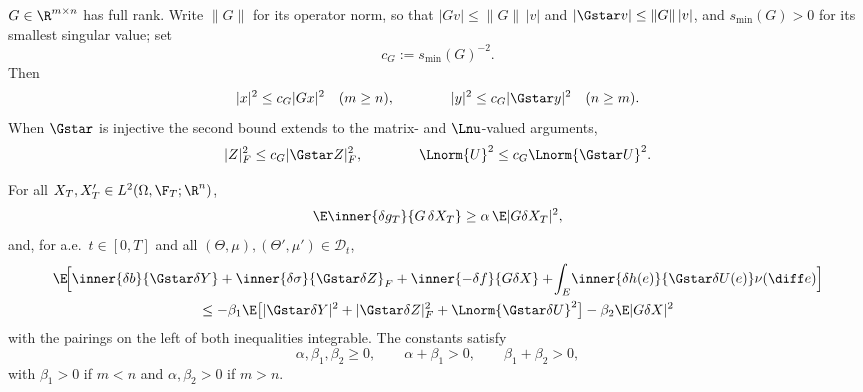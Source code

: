 \begin{assumption}\label{ass:G}
$G\in\R^{m\times n}$ has full rank. Write $\|G\|$ for its operator norm, so that
$|Gv|\le\|G\|\,|v|$ and $|\Gstar v|\le\|G\|\,|v|$, and $s_{\min}(G)>0$ for its
smallest singular value; set
\[
c_G:=s_{\min}(G)^{-2} .
\]
Then
\[
|x|^2\le c_G|Gx|^2\quad(m\ge n),
\qquad\qquad
|y|^2\le c_G|\Gstar y|^2\quad(n\ge m).
\]
When $\Gstar$ is injective the second bound extends to the matrix- and $\Lnu$-valued
arguments,
\[
|Z|_F^2\le c_G|\Gstar Z|_F^2,
\qquad\qquad
\Lnorm{U}^2\le c_G\Lnorm{\Gstar U}^2 .
\]
\end{assumption}
\begin{assumption}\label{ass:mono}
For all $X_T,X'_T\in L^2(\Omega,\F_T;\R^n)$,
\[
\E\inner{\delta g_T}{G\,\delta X_T}\ge\alpha\,\E|G\delta X_T|^2,
\]
and, for a.e.\ $t\in[0,T]$ and all $(\Theta,\mu),(\Theta',\mu')\in\mathcal D_t$,
\begin{multline}\label{eq:mono}
\E\!\Big[\inner{\delta b}{\Gstar\delta Y}+\inner{\delta\sigma}{\Gstar\delta Z}_F
+\inner{-\delta f}{G\delta X}+\!\int_E\!\inner{\delta h(e)}{\Gstar\delta U(e)}\nu(\diff e)\Big]\\
\le-\beta_1\E\big[|\Gstar\delta Y|^2+|\Gstar\delta Z|_F^2+\Lnorm{\Gstar\delta U}^2\big]-\beta_2\E|G\delta X|^2
\end{multline}
with the pairings on the left of both inequalities integrable. The constants satisfy
\[
\alpha,\beta_1,\beta_2\ge0,\qquad \alpha+\beta_1>0,\qquad \beta_1+\beta_2>0,
\]
with $\beta_1>0$ if $m<n$ and $\alpha,\beta_2>0$ if $m>n$.
\end{assumption}
